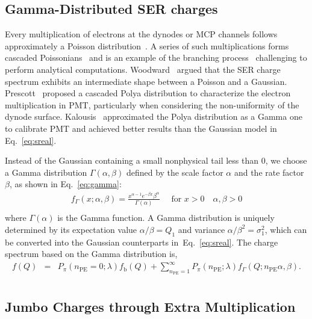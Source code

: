 \subsection{Gamma-Distributed SER charges}\label{gammapossion}
Every multiplication of electrons at the dynodes or MCP channels follows approximately a Poisson distribution~\cite{branchandPoisson}.
A series of such multiplications forms cascaded Poissonians~\cite{1955Scintillation} and is
an example of the branching process~\cite{Bartlett1963TheTO} challenging to perform analytical computations.
Woodward~\cite{Woodward} argued that the SER charge spectrum exhibits an intermediate shape between a Poisson and a Gaussian.
Prescott~\cite{polya} proposed a cascaded Polya distribution to characterize the electron multiplication in PMT,
particularly when considering the non-uniformity of the dynode surface.
Kalousis~\cite{2012Calibration,2020A} approximated the Polya distribution as a Gamma one to calibrate PMT
and achieved better results than the Gaussian model in Eq.~\eqref{eq:sreal}.

Instead of the Gaussian containing a small nonphysical tail less than 0,
we choose a Gamma distribution $\varGamma(\alpha, \beta)$
defined by the scale factor $\alpha$ and the rate factor $\beta$, as shown in Eq.~\eqref{eq:gamma}:
\begin{equation}
	\label{eq:gamma}
	\begin{aligned}
		f_\Gamma(x ; \alpha, \beta) = \frac{x^{\alpha-1} e^{-\beta x} \beta^\alpha}{\Gamma(\alpha)} \quad \text { for } x>0 \quad \alpha, \beta>0 \\
	\end{aligned}
\end{equation}
where $\Gamma(\alpha)$ is the Gamma function.
A Gamma distribution is uniquely determined by its expectation value \(\alpha/\beta=Q_1\) and variance \(\alpha/\beta^2=\sigma_1^2\),
which can be converted into the Gaussian counterparts in~Eq.~\eqref{eq:sreal}.
The charge spectrum based on the Gamma distribution is,
\begin{equation}
	\begin{aligned}
		f(Q) & = & P_{\pi}(n_{\mathrm{PE}}=0;\lambda)f_{\mathrm{b}}(Q) + \sum_{n_{\mathrm{PE}}=1}^{\infty}P_\pi(n_{\mathrm{PE}};\lambda) f_\Gamma(Q;n_{\mathrm{PE}}\alpha, \beta). \\
	\end{aligned}
	\label{eq:Gamma}
\end{equation}

\subsection{Jumbo Charges through Extra Multiplication}\label{sec:see}

